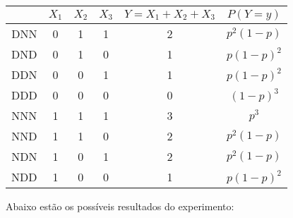 \begin{description}
\begin{example}
\begin{figure}[H]
       \centering
       
       \label{fig:}
     \end{figure}
     \begin{tabular}{c c c c c c }
       \toprule
       & $X_1$  & $X_2$ & $X_3$   & $Y= X_1 +X_2+ X_3$ & $ P(Y=y)$\\ \midrule
       DNN &0 & 1 & 1 & 2 & $p^2(1-p)$\\\midrule
       DND& 0 & 1 & 0 & 1 & $p(1-p)^2$\\\midrule
       DDN& 0 & 0 & 1 & 1 & $p(1-p)^2$\\\midrule
       DDD&  0 & 0 & 0 & 0 & $(1-p)^3$\\\midrule
       NNN&   1 & 1 & 1 & 3 & $p^3$\\\midrule
       NND& 1 & 1 & 0 & 2 & $p^2(1-p)$\\\midrule
       NDN& 1 & 0 & 1 & 2 & $p^2(1-p)$\\\midrule
       NDD& 1 & 0 & 0 & 1 & $p(1-p)^2$ \\ \bottomrule
     \end{tabular}

     Abaixo estão os possíveis resultados do experimento:


\end{example}
\end{description}
